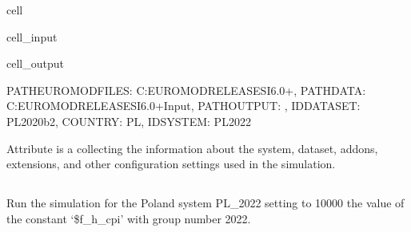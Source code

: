 \documentclass[letterpaper,10pt,english]{sphinxmanual}
\begin{document}
\begin{sphinxuseclass}{cell}
\begin{sphinxuseclass}{cell_input}
\begin{sphinxVerbatim}[commandchars=\\\{\}]
\PYG{p}{[}\PYG{p}{]}
\end{sphinxVerbatim}

\end{sphinxuseclass}
\begin{sphinxuseclass}{cell_output}
\begin{sphinxVerbatim}[commandchars=\\\{\}]
\PYGZob{}\PYGZsq{}PATH\PYGZus{}EUROMODFILES\PYGZsq{}: \PYGZsq{}C:\PYGZbs{}\PYGZbs{}EUROMOD\PYGZus{}RELEASES\PYGZus{}I6.0+\PYGZsq{},
 \PYGZsq{}PATH\PYGZus{}DATA\PYGZsq{}: \PYGZsq{}C:\PYGZbs{}\PYGZbs{}EUROMOD\PYGZus{}RELEASES\PYGZus{}I6.0+\PYGZbs{}\PYGZbs{}Input\PYGZsq{},
 \PYGZsq{}PATH\PYGZus{}OUTPUT\PYGZsq{}: \PYGZsq{}\PYGZsq{},
 \PYGZsq{}ID\PYGZus{}DATASET\PYGZsq{}: \PYGZsq{}PL\PYGZus{}2020\PYGZus{}b2\PYGZsq{},
 \PYGZsq{}COUNTRY\PYGZsq{}: \PYGZsq{}PL\PYGZsq{},
 \PYGZsq{}ID\PYGZus{}SYSTEM\PYGZsq{}: \PYGZsq{}PL\PYGZus{}2022\PYGZsq{}\PYGZcb{}
\end{sphinxVerbatim}

\end{sphinxuseclass}
\end{sphinxuseclass}
\sphinxAtStartPar
Attribute  is a   collecting the information about the system, dataset,  addons, extensions, and other configuration settings used in the simulation.


\subsection{}
\label{\detokenize{example:run-with-changing-constant}}
\sphinxAtStartPar
Run the simulation for the Poland system PL\_2022 setting to 10000 the value of the constant ‘\$f\_h\_cpi’ with group number 2022.
\end{document}
